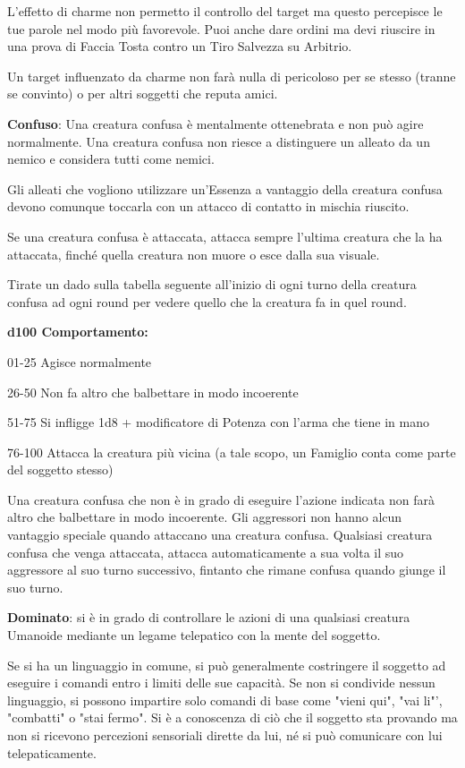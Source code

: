 \documentclass[a4paper,11pt,twoside,openany]{book}
\begin{document}
L'effetto di charme non permetto il controllo del target ma questo percepisce le tue parole nel modo più favorevole. Puoi anche dare ordini ma devi riuscire in una prova di Faccia Tosta contro un Tiro Salvezza su Arbitrio.

Un target influenzato da charme non farà nulla di pericoloso per se stesso (tranne se convinto) o per altri soggetti che reputa amici.

\textbf{Confuso}: Una creatura confusa è mentalmente ottenebrata e non può agire normalmente. Una creatura confusa non riesce a distinguere un alleato da un nemico e considera tutti come nemici.

Gli alleati che vogliono utilizzare un'Essenza a vantaggio della creatura confusa devono comunque toccarla con un attacco di contatto in mischia riuscito.

Se una creatura confusa è attaccata, attacca sempre l'ultima creatura che la ha attaccata, finché quella creatura non muore o esce dalla sua visuale.

Tirate un dado sulla tabella seguente all'inizio di ogni turno della
creatura confusa ad ogni round per vedere quello che la creatura fa
in quel round.

\textbf{d100 Comportamento:}

01-25 Agisce normalmente

26-50 Non fa altro che balbettare in modo incoerente

51-75 Si infligge 1d8 + modificatore di Potenza con l'arma che tiene in mano

76-100 Attacca la creatura più vicina (a tale scopo, un Famiglio conta come parte del soggetto stesso)

Una creatura confusa che non è in grado di eseguire l'azione indicata non farà altro che balbettare in modo incoerente. Gli aggressori non hanno alcun vantaggio speciale quando attaccano una creatura confusa. Qualsiasi creatura confusa che venga attaccata, attacca automaticamente a sua volta il suo aggressore al suo turno successivo, fintanto che rimane confusa quando giunge il suo turno.

\textbf{Dominato}: si è in grado di controllare le azioni di una qualsiasi creatura Umanoide mediante un legame telepatico con la mente del soggetto.

Se si ha un linguaggio in comune, si può generalmente costringere il soggetto ad eseguire i comandi entro i limiti delle sue capacità. Se non si condivide nessun linguaggio, si possono impartire solo comandi di base come "vieni qui", "vai li"', "combatti" o "stai fermo". Si è a conoscenza di ciò che il soggetto sta provando ma non si ricevono percezioni sensoriali dirette da lui, né si può comunicare con lui telepaticamente.
\end{document}
